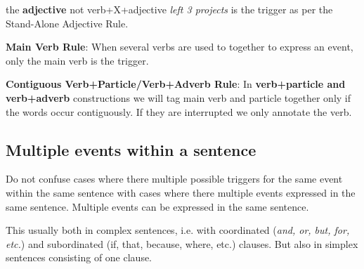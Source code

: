 \begin{exe}
    \ex {}
        \expl the \textbf{adjective}  not verb+X+adjective \textit{left 3 projects} is the trigger as per the Stand-Alone Adjective Rule.
\end{exe}

\noindent\textbf{Main Verb Rule}: When several verbs are used to together to express an event, only the main verb is the trigger.
\begin{exe}
    \ex {}
    \ex {}
    \ex {}
    \ex {}
\end{exe}

\noindent\textbf{Contiguous Verb+Particle/Verb+Adverb Rule}: In \textbf{verb+particle and verb+adverb} constructions we will tag main verb and particle together only if the words occur contiguously. If they are interrupted we only annotate the verb.
\begin{exe}
    \ex {}
    \ex {}
    \ex {}
    \ex {}
\end{exe}

\subsection{Multiple events within a sentence}
Do not confuse cases where there multiple possible triggers for the same event within the same sentence with cases where there multiple events expressed in the same sentence.
Multiple events can be expressed in the same sentence.

This usually both in complex sentences, i.e. with coordinated (\textit{and, or, but, for, etc.}) and subordinated (if, that, because, where, etc.) clauses.
But also in simplex sentences consisting of one clause.

\begin{exe}
    \ex {}
    \ex {}
\end{exe}

